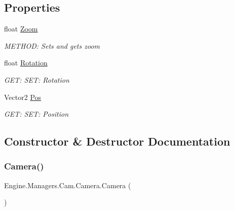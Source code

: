 \subsection*{Properties}
\begin{DoxyCompactItemize}
\item 
float \hyperlink{a00490_a625deed885e044306674bce674f7ad52}{Zoom}
\begin{DoxyCompactList}\small\item\em M\+E\+T\+H\+OD\+: Sets and gets zoom \end{DoxyCompactList}\item 
float \hyperlink{a00490_a18059d9071fd75793ceeee742c10e6bf}{Rotation}
\begin{DoxyCompactList}\small\item\em G\+ET\+: S\+ET\+: Rotation \end{DoxyCompactList}\item 
Vector2 \hyperlink{a00490_acbd14e79831528efd53d6363f5a8a531}{Pos}
\begin{DoxyCompactList}\small\item\em G\+ET\+: S\+ET\+: Position \end{DoxyCompactList}\end{DoxyCompactItemize}


\subsection{Constructor \& Destructor Documentation}
\mbox{\label{a00490_aa95d077fcb6779cf1d05dcd3924e47fd}} 
\subsubsection{\texorpdfstring{Camera()}{Camera()}}
{\footnotesize\ttfamily Engine.\+Managers.\+Cam.\+Camera.\+Camera (\begin{DoxyParamCaption}{ }\end{DoxyParamCaption})\hspace{0.3cm}{\ttfamily [inline]}}



